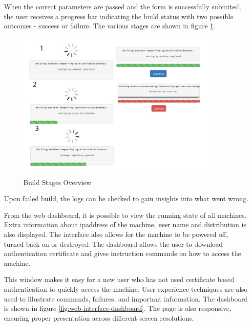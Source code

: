 \documentclass{article}
\begin{document}
When the correct parameters are passed and the form is successfully submited, the user receives a progress bar indicating the build status with two possible outcomes - success or failure. The various stages are shown in figure \ref{fig:build_stages}.

\begin{figure}[H]
	\vspace{0.5cm}
	\includegraphics[width=10cm]{build_stages.jpg}
	\vspace{0.5cm}
	\caption{Build Stages Overview}
	\label{fig:build_stages}
\end{figure}

Upon failed build, the logs can be checked to gain insights into what went wrong.

From the web dashboard, it is possible to view the running state of all machines. Extra information about \gls{ipaddress} of the machine, user name and distribution is also displayed. The interface also allows for the machine to be powered off, turned back on or destroyed. The dashboard allows the user to download authentication certificate and gives instruction commands on how to access the machine.

This window makes it easy for a new user who has not used certificate based authentication to quickly access the machine. User experience techniques are also used to illustrate commands, failures, and important information. The dashboard is shown in figure \ref{fig:web-interface-dashboard}. The page is also responsive, ensuring proper presentation across different screen resolutions.
\end{document}
